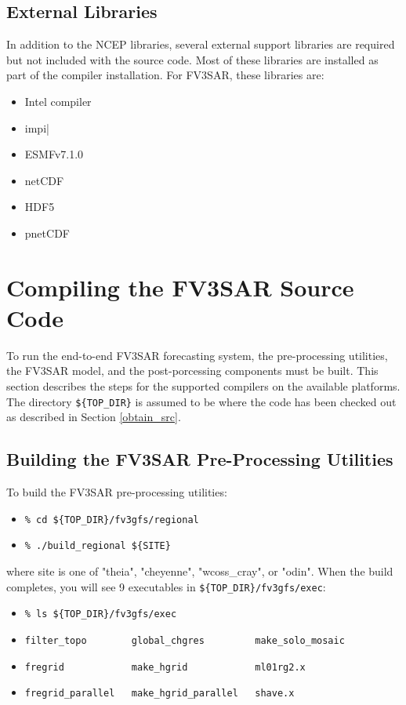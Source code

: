\subsection{External Libraries}

In addition to the NCEP libraries, several external support libraries are required but not included with
the source code.  Most of these libraries are installed as part of the compiler installation.  For FV3SAR, these
libraries are:

  \begin{itemize}
    \item Intel compiler
    \item impi|
    \item ESMFv7.1.0
    \item netCDF
    \item HDF5
    \item pnetCDF
  \end{itemize}


\section{Compiling the FV3SAR Source Code}

To run the end-to-end FV3SAR forecasting system, the pre-processing utilities, the FV3SAR model, and the
post-porcessing components must be built.  This section describes the steps for the supported compilers
on the available platforms.  The directory \verb|${TOP_DIR}| is assumed to be where the code has been checked 
out as described in Section \ref{obtain_src}.

\subsection{Building the FV3SAR Pre-Processing Utilities}

To build the FV3SAR pre-processing utilities:

\begin{itemize}
  \item[] \verb|% cd ${TOP_DIR}/fv3gfs/regional| 
  \item[] \verb|% ./build_regional ${SITE}|
\end{itemize}

where site is one of "theia", "cheyenne", "wcoss\_cray", or "odin".  When the build completes, you will see 9
executables in \verb|${TOP_DIR}/fv3gfs/exec|:

\begin{itemize}
  \item[] \verb|% ls ${TOP_DIR}/fv3gfs/exec| 
  \item[] \verb|filter_topo        global_chgres         make_solo_mosaic    | 
  \item[] \verb|fregrid            make_hgrid            ml01rg2.x           | 
  \item[] \verb|fregrid_parallel   make_hgrid_parallel   shave.x             | 
\end{itemize}

